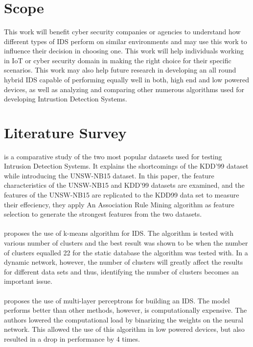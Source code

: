 \documentclass[a4paper,12pt]{article}
\begin{document}
	\section{Scope}
	\paragraph{}
	This work will benefit cyber security companies or agencies to understand how different types of IDS perform on similar environments and may use this work to influence their decision in choosing one. This work will help individuals working in IoT or cyber security domain in making the right choice for their specific scenarios. This work may also help future research in developing an all round hybrid IDS capable of performing equally well in both, high end and low powered devices, as well as analyzing and comparing other numerous algorithms used for developing Intrustion Detection Systems.

	\section{Literature Survey}
	\paragraph{}
    \cite{unsw15} is a comparative study of the two most popular datasets used for testing Intrusion Detection Systems. It explains the shortcomings of the KDD'99 dataset while introducing the UNSW-NB15 dataset. In this paper, the feature characteristics of the UNSW-NB15 and KDD'99 datasets are examined, and the features of the UNSW-NB15 are replicated to the KDD99 data set to measure their effeciency, they apply An Association Rule Mining algorithm as feature selection to generate the strongest features from the two datasets.
    \paragraph{}
	\cite{dm15} proposes the use of k-means algorithm for IDS. The algorithm is tested with various number of clusters and the best result was shown to be when the number of clusters equalled 22 for the static database the algorithm was tested with. In a dynamic network, however, the number of clusters will greatly affect the results for different data sets and thus, identifying the number of clusters becomes an important issue.
	\paragraph{}
	\cite{mlp17} proposes the use of multi-layer perceptrons for building an IDS. The model performs better than other methods, however, is computationally expensive. The authors lowered the computational load by binarizing the weights on the neural network. This allowed the use of this algorithm in low powered devices, but also resulted in a drop in performance by 4 times.
\end{document}
